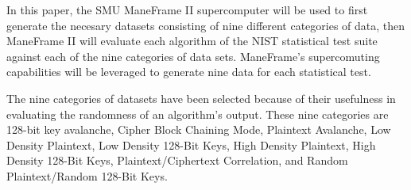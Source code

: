 \documentclass[conference]{IEEEtran}
\begin{document}
In this paper, the SMU ManeFrame II supercomputer will be used to first generate the necesary datasets consisting of nine different categories of data, then ManeFrame II will evaluate each algorithm of the NIST statistical test suite against each of the nine categories of data sets. ManeFrame's supercomuting capabilities will be leveraged to generate nine data for each statistical test.

The nine categories of datasets have been selected because of their usefulness in evaluating the randomness of an algorithm's output. These nine categories are 128-bit key avalanche, Cipher Block Chaining Mode, Plaintext Avalanche, Low Density Plaintext, Low Density 128-Bit Keys, High Density Plaintext, High Density 128-Bit Keys, Plaintext/Ciphertext Correlation, and Random Plaintext/Random 128-Bit Keys.

\end{document}
